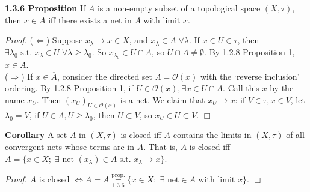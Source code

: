 \documentclass[12pt]{article}
\newcommand{\st}[0]{ \textrm{ s.t. } }
\newcommand{\rimply}[0] { \Rightarrow }
\newcommand{\limply}[0] { \Leftarrow }
\newcommand{\lrimply}[0] { \Leftrightarrow }
\newcommand{\rarw}[0] { \rightarrow }
\newcommand{\curlyO}[0] { \mathcal{O} }
\begin{document}
\begin{flushleft} {\bf 1.3.6 Proposition} If $A$ is a non-empty subset of a topological
space $(X, \tau)$, then $x \in \overline{A}$ iff there exists a net in $A$ with limit
 $x$.
\end{flushleft}

\begin{flushleft} \emph{Proof. } ($\limply$) Suppose $x_\lambda \rarw x \in X$,
 and $x_\lambda \in A \; \forall \lambda$.  If $x \in U \in \tau$, then $\exists
 \lambda_0 \st x_\lambda \in U \; \forall \lambda \ge \lambda_0$. So
  $x_{\lambda_0} \in U \cap A$, so $U \cap A \not = \emptyset$. By 1.2.8 Proposition 1,
  $x \in \overline{A}$.  \\
($\rimply$) If $x \in \overline{A}$, consider the directed set
$\Lambda = \curlyO(x)$ with the `reverse inclusion' ordering. By
1.2.8 Proposition 1, if $U \in \curlyO(x), \exists x \in U \cap A$.
  Call this $x$ by the name $x_U$. Then $(x_U) _ { U \in \curlyO(x)}$ is a net.
  We claim that $x_U \rarw x$: if $V
\in \tau, x \in V$,
 let $\lambda_0 = V$, if $U \in \Lambda, U  \ge \lambda_0$,
 then $U \subset  V$, so $x_U \in U \subset V$. $\Box$
\end{flushleft}


\begin{flushleft} {\bf Corollary} A set $A$ in $(X, \tau)$ is closed iff $A$ contains the limits in $(X, \tau)$ of all convergent nets whose terms are in $A$. That is, $A$ is closed iff $A = \{ x \in X; \; \exists \textrm{ net } (x_\lambda) \in A \st x_\lambda \rarw x \}$.
\end{flushleft}

\begin{flushleft} \emph{Proof. } $A$ is closed $\lrimply A = \overline{A}
 \underset{1.3.6}{\overset{\textrm{prop.} }{=}} \{ x \in X :  \; \exists \textrm{ net} \in A \textrm{ with limit } x\} $. $\Box$
\end{flushleft}
\end{document}
